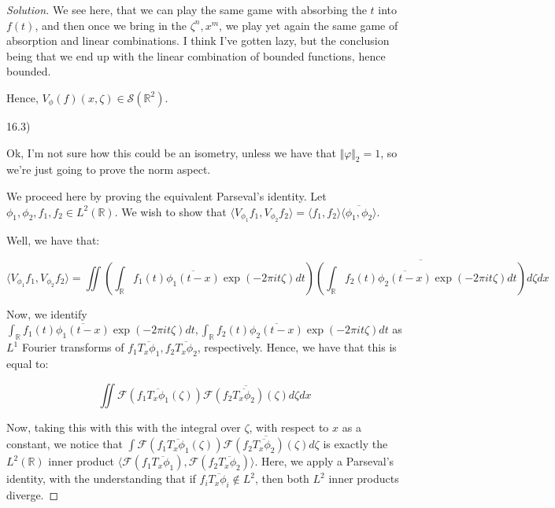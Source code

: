 \documentclass[10pt]{article}
\begin{document}
\begin{proof}[Solution]
We see here, that we can play the same game with absorbing the $t$ into $f(t)$, and then once we bring in the $\zeta^n, x^m$, we play yet again the same game of absorption and linear combinations. I think I've gotten lazy, but the conclusion being that we end up with the linear combination of bounded functions, hence bounded.

Hence, $V_\phi(f)(x, \zeta) \in \mathcal{S}(\mathbb{R}^2)$. 

16.3)

Ok, I'm not sure how this could be an isometry, unless we have that $\Vert \varphi \Vert_2 = 1$, so we're just going to prove the norm aspect.

We proceed here by proving the equivalent Parseval's identity. Let $\phi_1, \phi_2, f_1, f_2 \in L^2(\mathbb{R})$. We wish to show that $\langle V_{\phi_1} f_1, V_{\phi_2} f_2 \rangle = \langle f_1, f_2 \rangle \overline{\langle \phi_1, \phi_2 \rangle}$.

Well, we have that:

$$ \langle V_{\phi_1} f_1, V_{\phi_2} f_2 \rangle = \iint  \left( \int_{\mathbb{R}} f_1(t) \overline{\phi_1(t - x)} \exp( -2 \pi i t \zeta) dt \right) \overline{\left( \int_{\mathbb{R}}  f_2(t) \overline{\phi_2(t - x)} \exp(-2 \pi i t \zeta) dt \right)} d\zeta dx $$

Now, we identify $\int_{\mathbb{R}} f_1(t) \overline{\phi_1(t - x)} \exp( -2 \pi i t \zeta) dt, \int_{\mathbb{R}}  f_2(t) \overline{\phi_2(t - x)} \exp(-2 \pi i t \zeta) dt $ as $L^1$ Fourier transforms of $f_1 \overline{T_x \phi_1}, f_2 \overline{T_x \phi_2}$, respectively. Hence, we have that this is equal to:

$$ \iint \mathcal{F}( f_1 \overline{T_x \phi_1}( \zeta)) \overline{\mathcal{F}(f_2 \overline{T_x \phi_2})(\zeta)} d \zeta dx $$

Now, taking this with this with the integral over $\zeta$, with respect to $x$ as a constant, we notice that $ \int   \mathcal{F}( f_1 \overline{T_x \phi_1}( \zeta)) \overline{\mathcal{F}(f_2 \overline{T_x \phi_2})(\zeta)} d \zeta$ is exactly the $L^2(\mathbb{R})$ inner product $\langle \mathcal{F}( f_1 \overline{T_x \phi_1}), \mathcal{F}(f_2 \overline{T_x \phi_2}) \rangle $. Here, we apply a Parseval's identity, with the understanding that if $f_i \overline{T_x \phi_i} \not \in L^2$, then both $L^2$ inner products diverge.


 

\end{proof}
\end{document}
